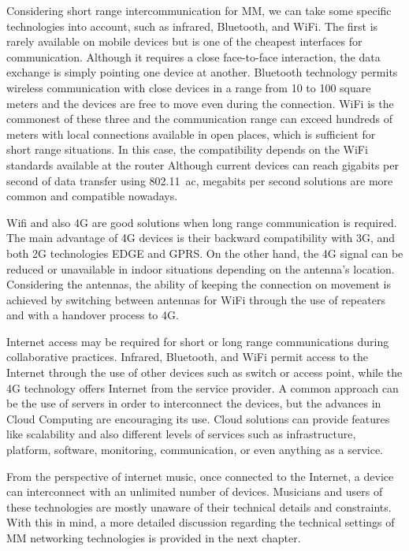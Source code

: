 Considering short range intercommunication for MM, we can take some specific technologies into account, such as infrared, Bluetooth, and WiFi.
The first is rarely available on mobile devices but is one of the cheapest interfaces for communication.
Although it requires a close face-to-face interaction, the data exchange is simply pointing one device at another.
Bluetooth technology permits wireless communication with close devices in a range from 10 to 100 square meters and the devices are free to move even during the connection.
WiFi is the commonest of these three and the communication range can exceed hundreds of meters with local connections available in open places, which is sufficient for short range situations.
In this case, the compatibility depends on the WiFi standards available at the router
Although current devices can reach gigabits per second of data transfer using 802.11~ac, megabits per second solutions are more common and compatible nowadays.

Wifi and also 4G are good solutions when long range communication is required.
The main advantage of 4G devices is their backward compatibility with 3G, and both 2G technologies EDGE and GPRS.
On the other hand, the 4G signal can be reduced or unavailable in indoor situations depending on the antenna's location.
Considering the antennas, the ability of keeping the connection on movement is achieved by switching between antennas for WiFi through the use of repeaters and with a handover process to 4G.

Internet access may be required for short or long range communications during collaborative practices.
Infrared, Bluetooth, and WiFi permit access to the Internet through the use of other devices such as switch or access point, while the 4G technology offers Internet from the service provider.
A common approach can be the use of servers in order to interconnect the devices, but the advances in Cloud Computing are encouraging its use.
Cloud solutions can provide features like scalability and also different levels of services such as infrastructure, platform, software, monitoring, communication, or even anything as a service.

From the perspective of internet music, once connected to the Internet, a device can interconnect with an unlimited number of devices.
Musicians and users of these technologies are mostly unaware of their technical details and constraints.
With this in mind, a more detailed discussion regarding the technical settings of MM networking technologies is provided in the next chapter.